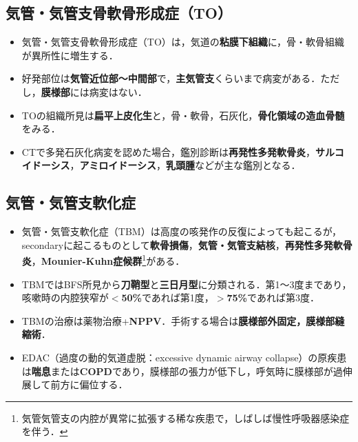 \subsection{気管・気管支骨軟骨形成症（TO）}

\begin{itemize}

\item 気管・気管支骨軟骨形成症（TO）は，気道の\textbf{粘膜下組織}に，骨・軟骨組織が異所性に増生する．
\item 好発部位は\textbf{気管近位部〜中間部}で，\textbf{主気管支}くらいまで病変がある．ただし，\textbf{膜様部}には病変はない．
\item TOの組織所見は\textbf{扁平上皮化生}と，骨・軟骨，石灰化，\textbf{骨化領域の造血骨髄}をみる．
\item CTで多発石灰化病変を認めた場合，鑑別診断は\textbf{再発性多発軟骨炎}，\textbf{サルコイドーシス}，\textbf{アミロイドーシス}，\textbf{乳頭腫}などが主な鑑別となる．


\end{itemize}

\subsection{気管・気管支軟化症}

\begin{itemize}

\item 気管・気管支軟化症（TBM）は高度の咳発作の反復によっても起こるが，secondaryに起こるものとして\textbf{軟骨損傷}，\textbf{気管・気管支結核}，\textbf{再発性多発軟骨炎}，\textbf{Mounier-Kuhn症候群}\footnote{気管気管支の内腔が異常に拡張する稀な疾患で，しばしば慢性呼吸器感染症を伴う．}がある．
\item TBMではBFS所見から\textbf{刀鞘型}と\textbf{三日月型}に分類される．第1〜3度まであり，咳嗽時の内腔狭窄が\textbf{$<$50\%}であれば第1度，\textbf{$>$75\%}であれば第3度．
\item TBMの治療は薬物治療+\textbf{NPPV}．手術する場合は\textbf{膜様部外固定，膜様部縫縮術}．
\item EDAC（過度の動的気道虚脱：excessive dynamic airway collapse）の原疾患は\textbf{喘息}または\textbf{COPD}であり，膜様部の張力が低下し，呼気時に膜様部が過伸展して前方に偏位する．


\end{itemize}

